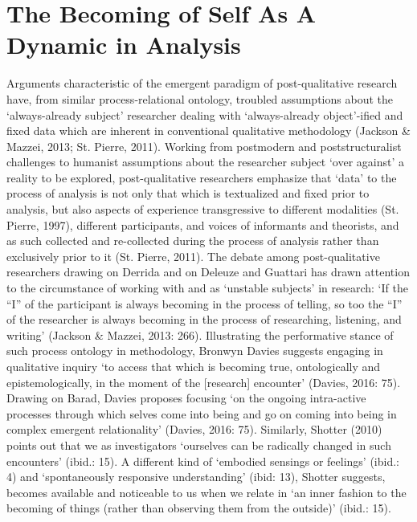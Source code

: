 \section{The Becoming of Self As A Dynamic in Analysis}
Arguments characteristic of the emergent paradigm of post-qualitative research have, from similar process-relational ontology, troubled assumptions about the ‘always-already subject’ researcher dealing with ‘always-already object’-ified and fixed data which are inherent in conventional qualitative methodology (Jackson \& Mazzei, 2013; St. Pierre, 2011). Working from postmodern and poststructuralist challenges to humanist assumptions about the researcher subject ‘over against’ a reality to be explored, post-qualitative researchers emphasize that ‘data’ to the process of analysis is not only that which is textualized and fixed prior to analysis, but also aspects of experience transgressive to different modalities (St. Pierre, 1997), different participants, and voices of informants and theorists, and as such collected and re-collected during the process of analysis rather than exclusively prior to it (St. Pierre, 2011). The debate among post-qualitative researchers drawing on Derrida and on Deleuze and Guattari has drawn attention to the circumstance of working with and as ‘unstable subjects’ in research: ‘If the “I” of the participant is always becoming in the process of telling, so too the “I” of the researcher is always becoming in the process of researching, listening, and writing’ (Jackson \& Mazzei, 2013: 266). Illustrating the performative stance of such process ontology in methodology, Bronwyn Davies suggests engaging in qualitative inquiry ‘to access that which is becoming true, ontologically and epistemologically, in the moment of the [research] encounter’ (Davies, 2016: 75). Drawing on Barad, Davies proposes focusing ‘on the ongoing intra-active processes through which selves come into being and go on coming into being in complex emergent relationality’ (Davies, 2016: 75). Similarly, Shotter (2010) points out that we as investigators ‘ourselves can be radically changed in such encounters’ (ibid.: 15). A different kind of ‘embodied sensings or feelings’ (ibid.: 4) and ‘spontaneously responsive understanding’ (ibid: 13), Shotter suggests, becomes available and noticeable to us when we relate in ‘an inner fashion to the becoming of things (rather than observing them from the outside)’ (ibid.: 15).

